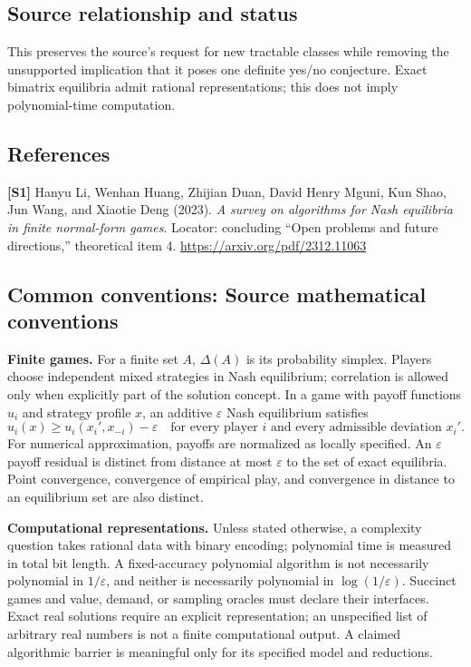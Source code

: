 \documentclass[11pt,a4paper]{article}
\begin{document}
\subsection*{Source relationship and status}
This preserves the source's request for new tractable classes while removing the unsupported implication that it poses one definite yes/no conjecture. Exact bimatrix equilibria admit rational representations; this does not imply polynomial-time computation.
\subsection*{References}
\begingroup\footnotesize\raggedright
{\footnotesize\raggedright
\textbf{[S1]} Hanyu Li, Wenhan Huang, Zhijian Duan, David Henry Mguni, Kun Shao, Jun Wang, and Xiaotie Deng (2023). \emph{A survey on algorithms for Nash equilibria in finite normal-form games}. Locator: concluding ``Open problems and future directions,'' theoretical item 4. \url{https://arxiv.org/pdf/2312.11063}\par}
\par\endgroup

\subsection*{Common conventions: Source mathematical conventions}

\textbf{Finite games.} For a finite set $A$, $\Delta(A)$ is its probability
simplex. Players choose independent mixed strategies in Nash equilibrium;
correlation is allowed only when explicitly part of the solution concept.
In a game with payoff functions $u_i$ and strategy profile $x$, an additive
$\varepsilon$ Nash equilibrium satisfies
\[
 u_i(x)\geq u_i(x_i',x_{-i})-\varepsilon
 \quad\text{for every player $i$ and every admissible deviation $x_i'$}.
\]
For numerical approximation, payoffs are normalized as locally specified.
An $\varepsilon$ payoff residual is distinct from distance at most
$\varepsilon$ to the set of exact equilibria. Point convergence, convergence
of empirical play, and convergence in distance to an equilibrium set are
also distinct.

\textbf{Computational representations.} Unless stated otherwise, a complexity
question takes rational data with binary encoding; polynomial time is measured
in total bit length. A fixed-accuracy polynomial algorithm is not necessarily
polynomial in $1/\varepsilon$, and neither is necessarily polynomial in
$\log(1/\varepsilon)$. Succinct games and value, demand, or sampling oracles
must declare their interfaces. Exact real solutions require an explicit
representation; an unspecified list of arbitrary real numbers is not a
finite computational output. A claimed algorithmic barrier is meaningful
only for its specified model and reductions.
\end{document}
